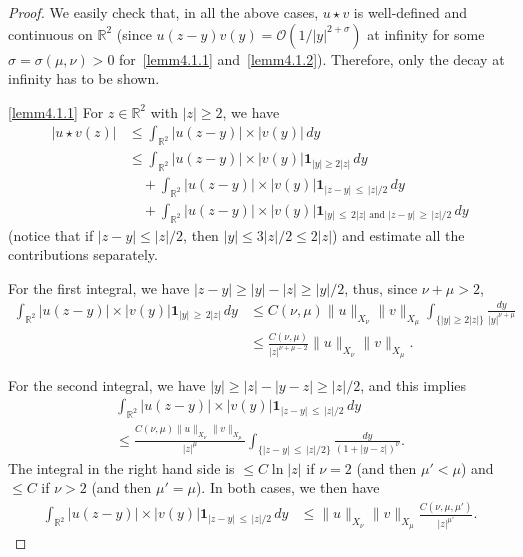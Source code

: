 \documentclass[10pt]{amsart}
\theoremstyle{definition}\newtheorem{defi}[theo]{Definition}\newtheorem{rema}[theo]{Remark}\newtheorem{exam}[theo]{Example}\newtheorem{exem}[theo]{Example}\newtheorem{nota}[theo]{Notation}
\newcommand*\R{\mathbb R}
\newcommand*\BO{\mathcal{O}}
\newcommand{\bfun}{\mathbf{1}}
\newcommand*\gs{\geqslant }
\newcommand*\ls{\leqslant }
\newcommand*\s{\sigma}
\begin{document}
\begin{proof}
We easily check that, in all the above cases, $ u \star v $ is well-defined and continuous on $ \R^2 $ (since $ u(z -y) v(y) = \BO(1/|y|^{2+\s}) $ at infinity for some $ \s = \s(\mu,\nu)> 0 $ for~\eqref{lemm4.1.1} and~\eqref{lemm4.1.2}). Therefore, only the decay at infinity has to be shown.

\noindent\eqref{lemm4.1.1} For $ z \in \R^2 $ with $ |z| \gs 2 $, we have
\begin{align*}
\lvert u \star v (z) \rvert & \ls \int_{\R^2} \lvert u (z-y) \rvert \times \lvert v (y) \rvert \, dy
\\
& \ls
\int_{\R^2} \lvert u (z-y) \rvert \times \lvert v(y) \rvert \bfun_{|y| \gs 2 |z| } \, dy
\\
& \quad + \int_{\R^2} \lvert u (z-y) \rvert \times \lvert v(y) \rvert \bfun_{ |z-y|\,\ls\,|z|/2 } \, dy
\\
& \quad + \int_{\R^2} \lvert u (z-y) \rvert \times \lvert v(y) \rvert \bfun_{|y|\,\ls\,2 |z| \text{ and } |z-y|\,\gs\,|z| /2 } \, dy
\end{align*}
(notice that if $ |z-y| \ls |z|/2 $, then $ |y| \ls 3|z|/2 \ls 2 |z| $) and estimate all the contributions separately.

For the first integral, we have $ |z-y| \gs |y| - |z| \gs |y|/2 $, thus, since $ \nu + \mu > 2 $,
\begin{align*}
\int_{\R^2} \lvert u (z -y) \rvert \times \lvert v(y) \rvert \bfun_{|y|\,\gs\,2 |z| } \, dy & \ls C(\nu, \mu) \| u \|_{X_{\nu}} \| v \|_{X_{\mu}} \int_{ \{ |y| \gs 2 |z| \} } \frac{dy}{|y|^{\nu +\mu}}
\\
& \ls \frac{C(\nu, \mu)}{ |z|^{\nu + \mu - 2 } } \| u \|_{X_{\nu}} \| v \|_{X_{\mu}}.
\end{align*}

For the second integral, we have $|y| \gs |z| - |y-z| \gs |z| /2 $, and this implies
\begin{multline*}
\int_{\R^2} \lvert u (z-y) \rvert \times \lvert v(y) \rvert \bfun_{ |z-y|\,\ls\,|z|/2 } \, dy \\ \ls \frac{C (\nu, \mu) \| u \|_{X_{\nu}} \| v \|_{ X_{\mu}} }{ |z|^{\mu} }
\int_{ \{ |z-y|\,\ls\,|z|/2 \} } \frac{dy}{ (1 + |y-z|)^\nu }.
\end{multline*}
The integral in the right hand side is $ \ls C \ln |z| $ if $ \nu = 2 $ (and then $ \mu ' < \mu $) and $ \ls C $ if $ \nu > 2 $ (and then $ \mu' = \mu $). In both cases, we then have
\begin{align*}
\int_{\R^2} \lvert u (z-y) \rvert \times \lvert v(y) \rvert \bfun_{ |z-y|\,\ls\,|z|/2 } \, dy & \ls \| u \|_{X_{\nu}} \| v \|_{X_{\mu}}
\frac{ C (\nu, \mu,\mu')}{ |z|^{\mu'} }.
\end{align*}


\end{proof}
\end{document}
